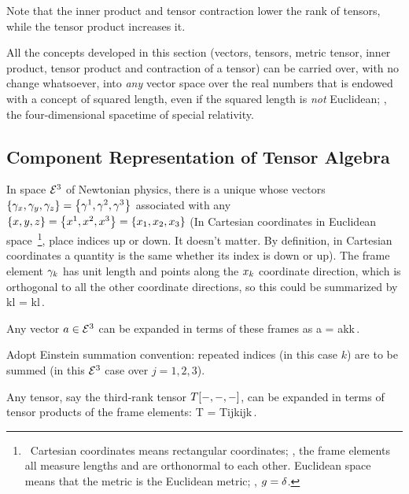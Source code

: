 Note that the inner product and tensor contraction lower the rank of tensors, while the tensor product increases it.

All the concepts developed in this section (vectors, tensors, metric tensor, inner product, tensor product and contraction of a tensor) can be carried over, with no change whatsoever, into \emph{any} vector space over the real numbers that is endowed with a concept of squared length, even if the squared length is \emph{not} Euclidean; \eg, the four-dimensional spacetime of special relativity.


\subsection{Component Representation of Tensor Algebra}
In space $\mathcal{E}^{3}$ of Newtonian physics, there is a unique  whose vectors $\left\lbrace{\gamma_{x}, \gamma_{y}, \gamma_{z}}\right\rbrace = \left\lbrace{\gamma^{1}, \gamma^{2}, \gamma^{3}}\right\rbrace$ associated with any  $\left\lbrace{x,y,z}\right\rbrace = \left\lbrace{{x}^{1}, {x}^{2}, {x}^{3}}\right\rbrace = \left\lbrace{{x}_{1}, {x}_{2}, {x}_{3}}\right\rbrace$ (In Cartesian coordinates in Euclidean space~\footnote{~Cartesian coordinates means rectangular coordinates; \ie, the frame elements all measure lengths and are orthonormal to each other. Euclidean space means that the metric is the Euclidean metric; \ie, $g = \delta$.}, place indices up or down. It doesn't matter. By definition, in Cartesian coordinates a quantity is the same whether its index is down or up). The frame element $\gamma_{k}$ has unit length and points along the ${x}_{k}$ coordinate direction, which is orthogonal to all the other coordinate directions, so this could be summarized by
\beq
\nbvec k\iprod\nbvec l = \ikron kl\,.
\eeq

Any vector $a\in\mathcal{E}^{3}$ can be expanded in terms of these frames as
\beq
a = \cnvec ak\nbvec k\,.
\eeq

Adopt Einstein summation convention: repeated indices (in this case $k$) are to be summed (in this $\mathcal{E}^{3}$ case over $j=1,2,3$). 

Any tensor, say the third-rank tensor $T\!\left[{-, -, -}\right]$, can be expanded in terms of tensor products of the frame elements:
\beq
T = \cntens T{ijk}\nbvec i\tprod\nbvec j\tprod\nbvec k\,.
\eeq

